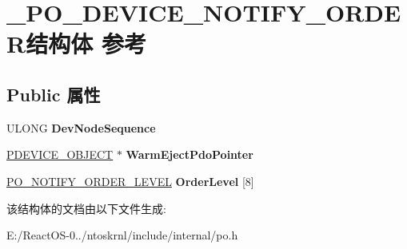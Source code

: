 \hypertarget{struct___p_o___d_e_v_i_c_e___n_o_t_i_f_y___o_r_d_e_r}{}\section{\+\_\+\+P\+O\+\_\+\+D\+E\+V\+I\+C\+E\+\_\+\+N\+O\+T\+I\+F\+Y\+\_\+\+O\+R\+D\+E\+R结构体 参考}
\label{struct___p_o___d_e_v_i_c_e___n_o_t_i_f_y___o_r_d_e_r}
\subsection*{Public 属性}
\begin{DoxyCompactItemize}
\item 
\mbox{\label{struct___p_o___d_e_v_i_c_e___n_o_t_i_f_y___o_r_d_e_r_a953d428e9cbe1e781dcf1939595b5f2a}} 
U\+L\+O\+NG {\bfseries Dev\+Node\+Sequence}
\item 
\mbox{\label{struct___p_o___d_e_v_i_c_e___n_o_t_i_f_y___o_r_d_e_r_a96e386bfe1ea05679e201c3e7595f8db}} 
\hyperlink{struct___d_e_v_i_c_e___o_b_j_e_c_t}{P\+D\+E\+V\+I\+C\+E\+\_\+\+O\+B\+J\+E\+CT} $\ast$ {\bfseries Warm\+Eject\+Pdo\+Pointer}
\item 
\mbox{\label{struct___p_o___d_e_v_i_c_e___n_o_t_i_f_y___o_r_d_e_r_aabd1ebd51653d41f97c3fed4a8cc7cb7}} 
\hyperlink{struct___p_o___n_o_t_i_f_y___o_r_d_e_r___l_e_v_e_l}{P\+O\+\_\+\+N\+O\+T\+I\+F\+Y\+\_\+\+O\+R\+D\+E\+R\+\_\+\+L\+E\+V\+EL} {\bfseries Order\+Level} \mbox{[}8\mbox{]}
\end{DoxyCompactItemize}


该结构体的文档由以下文件生成\+:\begin{DoxyCompactItemize}
\item 
E\+:/\+React\+O\+S-\/0../ntoskrnl/include/internal/po.\+h\end{DoxyCompactItemize}
